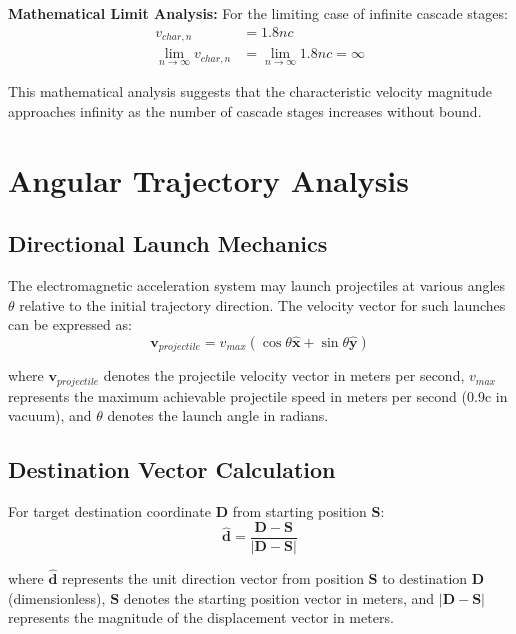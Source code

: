 \documentclass[12pt,a4paper]{article}
\begin{document}
\textbf{Mathematical Limit Analysis:}
For the limiting case of infinite cascade stages:
\begin{align}
v_{char,n} &= 1.8nc \\
\lim_{n \to \infty} v_{char,n} &= \lim_{n \to \infty} 1.8nc = \infty
\end{align}

This mathematical analysis suggests that the characteristic velocity magnitude approaches infinity as the number of cascade stages increases without bound.

\section{Angular Trajectory Analysis}

\subsection{Directional Launch Mechanics}

The electromagnetic acceleration system may launch projectiles at various angles $\theta$ relative to the initial trajectory direction. The velocity vector for such launches can be expressed as:
\begin{equation}
\mathbf{v}_{projectile} = v_{max}(\cos\theta\hat{\mathbf{x}} + \sin\theta\hat{\mathbf{y}})
\end{equation}

where $\mathbf{v}_{projectile}$ denotes the projectile velocity vector in meters per second, $v_{max}$ represents the maximum achievable projectile speed in meters per second (0.9c in vacuum), and $\theta$ denotes the launch angle in radians.

\subsection{Destination Vector Calculation}

For target destination coordinate $\mathbf{D}$ from starting position $\mathbf{S}$:
\begin{equation}
\hat{\mathbf{d}} = \frac{\mathbf{D} - \mathbf{S}}{|\mathbf{D} - \mathbf{S}|}
\end{equation}

where $\hat{\mathbf{d}}$ represents the unit direction vector from position $\mathbf{S}$ to destination $\mathbf{D}$ (dimensionless), $\mathbf{S}$ denotes the starting position vector in meters, and $|\mathbf{D} - \mathbf{S}|$ represents the magnitude of the displacement vector in meters.
\end{document}
